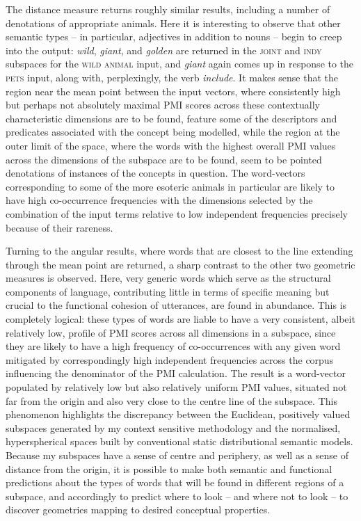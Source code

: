 The distance measure returns roughly similar results, including a number of denotations of appropriate animals.  Here it is interesting to observe that other semantic types -- in particular, adjectives in addition to nouns -- begin to creep into the output: \emph{wild}, \emph{giant}, and \emph{golden} are returned in the \textsc{joint} and \textsc{indy} subspaces for the \textsc{wild animal} input, and \emph{giant} again comes up in response to the \textsc{pets} input, along with, perplexingly, the verb \emph{include}.  It makes sense that the region near the mean point between the input vectors, where consistently high but perhaps not absolutely maximal PMI scores across these contextually characteristic dimensions are to be found, feature some of the descriptors and predicates associated with the concept being modelled, while the region at the outer limit of the space, where the words with the highest overall PMI values across the dimensions of the subspace are to be found, seem to be pointed denotations of instances of the concepts in question.  The word-vectors corresponding to some of the more esoteric animals in particular are likely to have high co-occurrence frequencies with the dimensions selected by the combination of the input terms relative to low independent frequencies precisely because of their rareness.

Turning to the angular results, where words that are closest to the line extending through the mean point are returned, a sharp contrast to the other two geometric measures is observed.  Here, very generic words which serve as the structural components of language, contributing little in terms of specific meaning but crucial to the functional cohesion of utterances, are found in abundance.  This is completely logical: these types of words are liable to have a very consistent, albeit relatively low, profile of PMI scores across all dimensions in a subspace, since they are likely to have a high frequency of co-occurrences with any given word mitigated by correspondingly high independent frequencies across the corpus influencing the denominator of the PMI calculation.  The result is a word-vector populated by relatively low but also relatively uniform PMI values, situated not far from the origin and also very close to the centre line of the subspace.  This phenomenon highlights the discrepancy between the Euclidean, positively valued subspaces generated by my context sensitive methodology and the normalised, hyperspherical spaces built by conventional static distributional semantic models.  Because my subspaces have a sense of centre and periphery, as well as a sense of distance from the origin, it is possible to make both semantic and functional predictions about the types of words that will be found in different regions of a subspace, and accordingly to predict where to look -- and where not to look -- to discover geometries mapping to desired conceptual properties.

